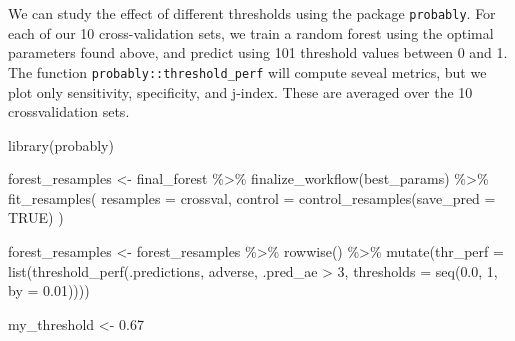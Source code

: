 \documentclass[
]{article}
\newenvironment{Shaded}{\begin{snugshade}}{\end{snugshade}}
\newcommand{\AttributeTok}[1]{\textcolor[rgb]{0.77,0.63,0.00}{#1}}
\newcommand{\ConstantTok}[1]{\textcolor[rgb]{0.00,0.00,0.00}{#1}}
\newcommand{\DecValTok}[1]{\textcolor[rgb]{0.00,0.00,0.81}{#1}}
\newcommand{\FloatTok}[1]{\textcolor[rgb]{0.00,0.00,0.81}{#1}}
\newcommand{\FunctionTok}[1]{\textcolor[rgb]{0.00,0.00,0.00}{#1}}
\newcommand{\NormalTok}[1]{#1}
\newcommand{\OtherTok}[1]{\textcolor[rgb]{0.56,0.35,0.01}{#1}}
\newcommand{\SpecialCharTok}[1]{\textcolor[rgb]{0.00,0.00,0.00}{#1}}
\newcommand{\StringTok}[1]{\textcolor[rgb]{0.31,0.60,0.02}{#1}}
\begin{document}
We can study the effect of different thresholds using the package
\texttt{probably}. For each of our 10 cross-validation sets, we train a
random forest using the optimal parameters found above, and predict
using 101 threshold values between 0 and 1. The function
\texttt{probably::threshold\_perf} will compute seveal metrics, but we
plot only sensitivity, specificity, and j-index. These are averaged over
the 10 crossvalidation sets.

\begin{Shaded}
\begin{Highlighting}[]
\FunctionTok{library}\NormalTok{(probably)}

\NormalTok{forest\_resamples }\OtherTok{\textless{}{-}}
\NormalTok{  final\_forest }\SpecialCharTok{\%\textgreater{}\%}
  \FunctionTok{finalize\_workflow}\NormalTok{(best\_params) }\SpecialCharTok{\%\textgreater{}\%}
  \FunctionTok{fit\_resamples}\NormalTok{(}
      \AttributeTok{resamples =}\NormalTok{ crossval,}
      \AttributeTok{control =} \FunctionTok{control\_resamples}\NormalTok{(}\AttributeTok{save\_pred =} \ConstantTok{TRUE}\NormalTok{)}
\NormalTok{  )}

\NormalTok{forest\_resamples }\OtherTok{\textless{}{-}}
\NormalTok{  forest\_resamples }\SpecialCharTok{\%\textgreater{}\%}
  \FunctionTok{rowwise}\NormalTok{() }\SpecialCharTok{\%\textgreater{}\%}
  \FunctionTok{mutate}\NormalTok{(}\AttributeTok{thr\_perf =} \FunctionTok{list}\NormalTok{(}\FunctionTok{threshold\_perf}\NormalTok{(.predictions, adverse, }\StringTok{\textasciigrave{}}\AttributeTok{.pred\_ae \textgreater{} 3}\StringTok{\textasciigrave{}}\NormalTok{, }\AttributeTok{thresholds =} \FunctionTok{seq}\NormalTok{(}\FloatTok{0.0}\NormalTok{, }\DecValTok{1}\NormalTok{, }\AttributeTok{by =} \FloatTok{0.01}\NormalTok{))))}

\NormalTok{my\_threshold }\OtherTok{\textless{}{-}} \FloatTok{0.67}


\end{Highlighting}
\end{Shaded}
\end{document}
